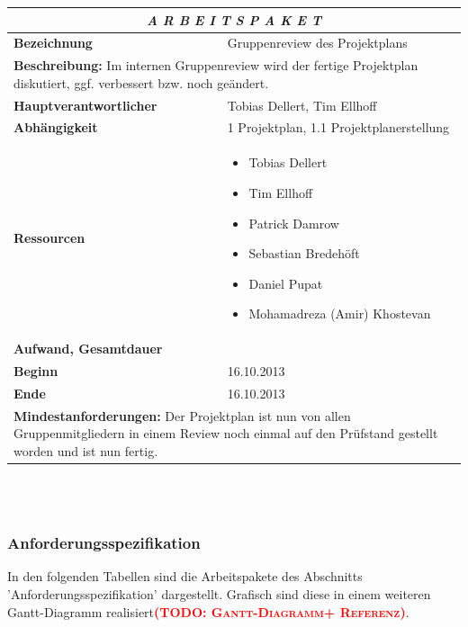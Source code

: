 \documentclass[fontsize=12pt,paper=a4,twoside]{scrartcl}
\newcommand{\todo}[1]{\textbf{\textsc{\textcolor{red}{(TODO: #1)}}}}
\begin{document}
\begin{tabular}{p{7.5cm}|p{7.5cm}}\toprule
\multicolumn{2}{c}{\textbf{\textit{A R B E I T S P A K E T \quad 1.2}}} \\ \toprule \hline
\textbf{Bezeichnung} & Gruppenreview des Projektplans\\\hline
\multicolumn{2}{p{15cm}}{\textbf{Beschreibung:} \newline 
Im internen Gruppenreview wird der fertige Projektplan diskutiert, ggf. verbessert bzw. noch geändert.}  \\\hline
\textbf{Hauptverantwortlicher} & Tobias Dellert, Tim Ellhoff \\\hline
\textbf{Abhängigkeit} & 1 Projektplan, 1.1 Projektplanerstellung\\\hline
\textbf{Ressourcen} & \begin{itemize}
\itemsep0pt
\item Tobias Dellert
\item Tim Ellhoff
\item Patrick Damrow
\item Sebastian Bredehöft
\item Daniel Pupat
\item Mohamadreza (Amir) Khostevan
\end{itemize} \\\hline
\textbf{Aufwand, Gesamtdauer} & \\\hline
\textbf{Beginn} & 16.10.2013 \\\hline
\textbf{Ende} & 16.10.2013\\\hline
\multicolumn{2}{p{15cm}}{\textbf{Mindestanforderungen: } \newline
Der Projektplan ist nun von allen Gruppenmitgliedern in einem Review noch einmal auf den Prüfstand gestellt worden und ist nun fertig. }  \\ \toprule
\end{tabular} \\\\

\subsubsection{Anforderungsspezifikation}\label{aps}

In den folgenden Tabellen sind die Arbeitspakete des Abschnitts 'Anforderungsspezifikation' dargestellt. Grafisch sind diese in einem weiteren Gantt-Diagramm realisiert\todo{Gantt-Diagramm+ Referenz}.
\end{document}
